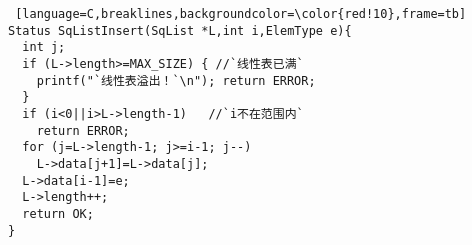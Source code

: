 \begin{lstlisting} [language=C,breaklines,backgroundcolor=\color{red!10},frame=tb]
Status SqListInsert(SqList *L,int i,ElemType e){
  int j;
  if (L->length>=MAX_SIZE) { //`线性表已满`
    printf("`线性表溢出！`\n"); return ERROR;
  }
  if (i<0||i>L->length-1)   //`i不在范围内`
    return ERROR;
  for (j=L->length-1; j>=i-1; j--)
    L->data[j+1]=L->data[j];
  L->data[i-1]=e;
  L->length++;
  return OK;
}
\end{lstlisting}
